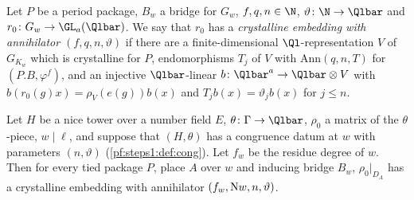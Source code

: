 \begin{definition}\label{pf:steps1:def:incrys}
Let $P$ be a period package, $B_w$ a bridge for $G_w$, $f,q,n\in\N$, $\vartheta\colon\N\to\Qlbar$ and
$r_0\colon G_w\to\GL_a(\Qlbar)$. We say that $r_0$ has a \emph{crystalline embedding with annihilator
$(f,q,n,\vartheta)$} if there are a finite-dimensional $\Ql$-representation $V$ of $G_{K_w}$ which is crystalline for
$P$, endomorphisms $T_j$ of $V$ with $\mathrm{Ann}(q,n,T)$ for $(P.B,\varphi^f)$, and an injective $\Qlbar$-linear
$b\colon\Qlbar^a\to\Qlbar\otimes V$ with $b(r_0(g)x)=\rho_V(e(g))b(x)$ and $T_jb(x)=\vartheta_jb(x)$ for $j\le n$.
\end{definition}

\begin{proposition}\label{pf:steps1:geoside}
Let $H$ be a nice tower over a number field $E$, $\theta\colon\Gamma\to\Qlbar$, $\rho_0$ a matrix of the $\theta$-piece,
$w\mid\ell$, and suppose that $(H,\theta)$ has a congruence datum at $w$ with parameters $(n,\vartheta)$
(\cref{pf:steps1:def:cong}). Let $f_w$ be the residue degree of $w$. Then for every tied package $P$, place $A$ over $w$ and
inducing bridge $B_w$, $\rho_0|_{D_A}$ has a crystalline embedding with annihilator $(f_w,\mathrm{N}w,n,\vartheta)$.
\end{proposition}

